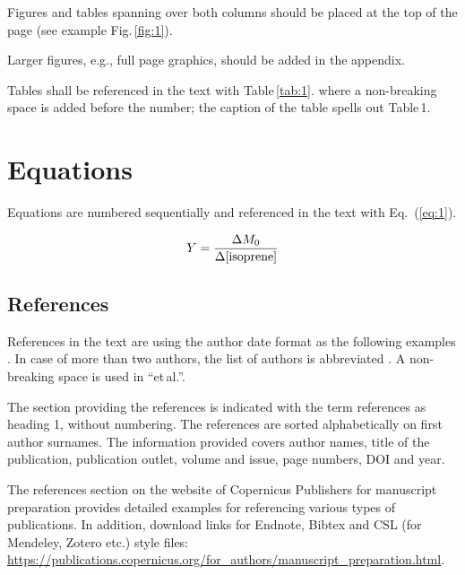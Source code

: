 \documentclass[agile, final]{copernicus-agile}
\begin{document}
Figures and tables spanning over both columns should be placed at the top of the page (see example Fig.\,\ref{fig:1}).

Larger figures, e.g., full page graphics, should be added in the appendix.

Tables shall be referenced in the text with Table\,\ref{tab:1}. where a non-breaking space is added before the number; the caption of the table spells out Table\,1.

\section{Equations}
Equations are numbered sequentially and referenced in the text with Eq.\, (\ref{eq:1}).

\begin{equation}
Y=\frac{\Delta M_{0}}{\Delta[\textnormal{isoprene}]}
\label{eq:1}
\end{equation}

\subsection{References}
References in the text are using the author date format as the following examples \citep{bib1_2019,bib3_2020,bib4_2021}. In case of more than two authors, the list of authors is abbreviated \citep[e.g.][]{bib2_2020,bib5_2020,bib6_2019}. A non-breaking space is used in “et\,al.”.

The section providing the references is indicated with the term references as heading 1, without numbering. The references are sorted alphabetically on first author surnames. The information provided covers author names, title of the publication, publication outlet, volume and issue, page numbers, DOI and year.

The references section on the website of Copernicus Publishers for manuscript preparation provides detailed examples for referencing various types of publications. In addition, download links for Endnote, Bibtex and CSL (for Mendeley, Zotero etc.) style files: \url{https://publications.copernicus.org/for_authors/manuscript_preparation.html}.




\end{document}

